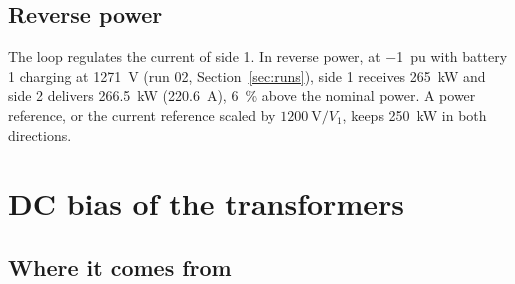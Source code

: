 \documentclass[12pt,a4paper]{scrartcl}
\newcommand{\ped}[1]{_{\mathrm{#1}}}
\begin{document}
\begin{onehalfspace}
\subsection{Reverse power}
\label{sec:reverse}

The loop regulates the current of side 1. In reverse power, at \SI{-1}{pu} with battery 1 charging at \SI{1271}{\volt} (run 02, Section~\ref{sec:runs}), side 1 receives \SI{265}{\kilo\watt} and side 2 delivers \SI{266.5}{\kilo\watt} (\SI{220.6}{\ampere}), \SI{6}{\percent} above the nominal power. A power reference, or the current reference scaled by $\SI{1200}{\volt}/V\ped{1}$, keeps \SI{250}{\kilo\watt} in both directions.

\section{DC bias of the transformers}
\label{sec:dcbias}

\subsection{Where it comes from}
\label{sec:dc_origin}


\end{onehalfspace}
\end{document}
